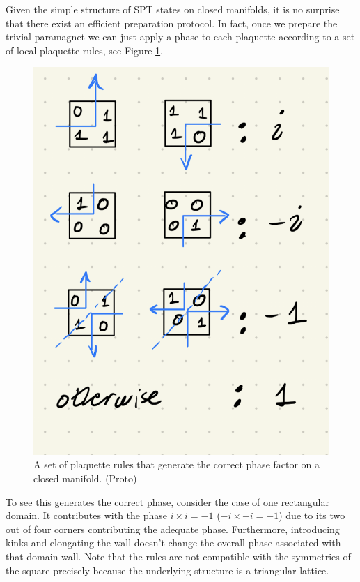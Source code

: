 \documentclass[a4paper,twocolumn,11pt]{quantumarticle}
\begin{document}
Given the simple structure of SPT states on closed manifolds, it is no surprise that there exist an efficient preparation protocol. In fact, once we prepare the trivial paramagnet we can just apply a phase to each plaquette according to a set of local plaquette rules, see Figure \ref{fig:plaq}.\begin{figure}
\centering
\includegraphics[width=\linewidth]{Figures/plaq_rules.png}
\caption{A set of plaquette rules that generate the correct phase factor on a closed manifold. (Proto)}
\label{fig:plaq}
\end{figure}
To see this generates the correct phase, consider the case of one rectangular domain. It contributes with the phase $i \times i =  - 1$ ($-i \times -i =  - 1$) due to its two out of four corners contributing the adequate phase. Furthermore, introducing kinks and elongating the wall doesn't change the overall phase associated with that domain wall. Note that the rules are not compatible with the symmetries of the square precisely because the underlying structure is a triangular lattice.
\end{document}
